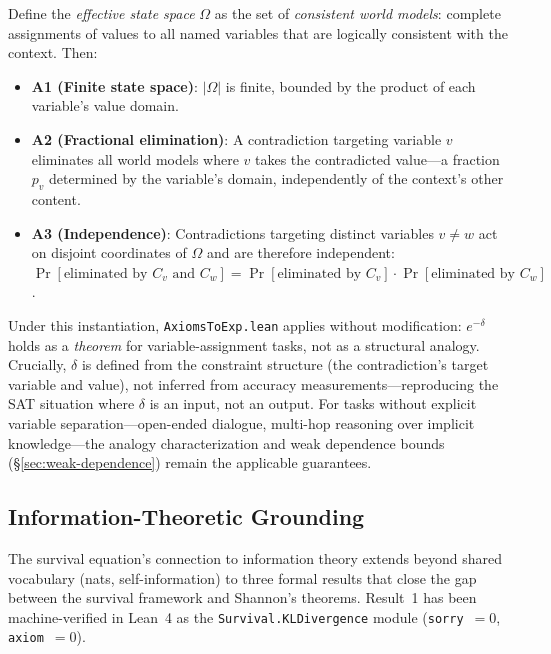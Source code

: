 \documentclass[11pt,a4paper]{article}
\begin{document}
Define the \emph{effective state space} $\Omega$ as the set of \emph{consistent world models}: complete assignments of values to all named variables that are logically consistent with the context. Then:
\begin{itemize}
  \item \textbf{A1 (Finite state space)}: $|\Omega|$ is finite, bounded by the product of each variable's value domain.
  \item \textbf{A2 (Fractional elimination)}: A contradiction targeting variable $v$ eliminates all world models where $v$ takes the contradicted value---a fraction $p_v$ determined by the variable's domain, independently of the context's other content.
  \item \textbf{A3 (Independence)}: Contradictions targeting distinct variables $v \neq w$ act on disjoint coordinates of $\Omega$ and are therefore independent: $\Pr[\text{eliminated by } C_v \text{ and } C_w] = \Pr[\text{eliminated by } C_v]\cdot\Pr[\text{eliminated by } C_w]$.
\end{itemize}
Under this instantiation, \texttt{AxiomsToExp.lean} applies without modification: $e^{-\delta}$ holds as a \emph{theorem} for variable-assignment tasks, not as a structural analogy. Crucially, $\delta$ is defined from the constraint structure (the contradiction's target variable and value), not inferred from accuracy measurements---reproducing the SAT situation where $\delta$ is an input, not an output. For tasks without explicit variable separation---open-ended dialogue, multi-hop reasoning over implicit knowledge---the analogy characterization and weak dependence bounds (\S\ref{sec:weak-dependence}) remain the applicable guarantees.

\subsection{Information-Theoretic Grounding}
\label{sec:info-theory-grounding}

The survival equation's connection to information theory extends beyond shared vocabulary (nats, self-information) to three formal results that close the gap between the survival framework and Shannon's theorems. Result~1 has been machine-verified in Lean~4 as the \texttt{Survival.KLDivergence} module (\texttt{sorry}~$= 0$, \texttt{axiom}~$= 0$).
\end{document}
